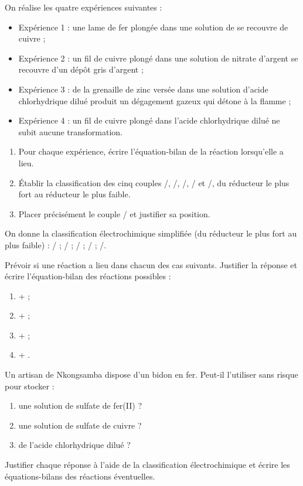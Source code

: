 \documentclass[11pt]{article}
\begin{document}
\begin{exercice}
On réalise les quatre expériences suivantes :
\begin{itemize}
    \item Expérience 1 : une lame de fer plongée dans une solution de  se recouvre de cuivre ;
    \item Expérience 2 : un fil de cuivre plongé dans une solution de nitrate d'argent  se recouvre d'un dépôt gris d'argent ;
    \item Expérience 3 : de la grenaille de zinc versée dans une solution d'acide chlorhydrique dilué produit un dégagement gazeux qui détone à la flamme ;
    \item Expérience 4 : un fil de cuivre plongé dans l'acide chlorhydrique dilué ne subit aucune transformation.
\end{itemize}
\begin{enumerate}
    \item Pour chaque expérience, écrire l'équation-bilan de la réaction lorsqu'elle a lieu.
    \item Établir la classification des cinq couples /, /, /, / et /, du réducteur le plus fort au réducteur le plus faible.
    \item Placer précisément le couple / et justifier sa position.
\end{enumerate}
\end{exercice}

\begin{exercice}
On donne la classification électrochimique simplifiée (du réducteur le plus fort au plus faible) :
/ ; / ; / ; / ; /.

Prévoir si une réaction a lieu dans chacun des cas suivants. Justifier la réponse et écrire l'équation-bilan des réactions possibles :
\begin{enumerate}
    \item {} +  ;
    \item {} +  ;
    \item {} +  ;
    \item {} + .
\end{enumerate}
\end{exercice}

\begin{exercice}
Un artisan de Nkongsamba dispose d'un bidon en fer. Peut-il l'utiliser sans risque pour stocker :
\begin{enumerate}
    \item une solution de sulfate de fer(II)  ?
    \item une solution de sulfate de cuivre  ?
    \item de l'acide chlorhydrique dilué  ?
\end{enumerate}
Justifier chaque réponse à l'aide de la classification électrochimique et écrire les équations-bilans des réactions éventuelles.
\end{exercice}
\end{document}
